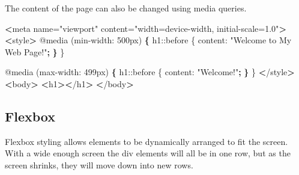 \documentclass[]{book}
\newenvironment{Shaded}{\begin{snugshade}}{\end{snugshade}}
\newcommand{\KeywordTok}[1]{\textcolor[rgb]{0.13,0.29,0.53}{\textbf{#1}}}
\newcommand{\StringTok}[1]{\textcolor[rgb]{0.31,0.60,0.02}{#1}}
\newcommand{\OperatorTok}[1]{\textcolor[rgb]{0.81,0.36,0.00}{\textbf{#1}}}
\newcommand{\ExtensionTok}[1]{#1}
\newcommand{\NormalTok}[1]{#1}
\begin{document}
The content of the page can also be changed using media queries.

\begin{Shaded}
\begin{Highlighting}[]
\OperatorTok{<}\ExtensionTok{meta}\NormalTok{ name=}\StringTok{"viewport"}\NormalTok{ content=}\StringTok{"width=device-width, initial-scale=1.0"}\OperatorTok{>}
\OperatorTok{<}\ExtensionTok{style}\OperatorTok{>}
    \ExtensionTok{@media}\NormalTok{ (min-width: 500px) }\KeywordTok{\{}
        \ExtensionTok{h1}\NormalTok{::before \{}
            \ExtensionTok{content}\NormalTok{: }\StringTok{"Welcome to My Web Page!"}\KeywordTok{;}
        \KeywordTok{\}}
\NormalTok{    \}}

    \ExtensionTok{@media}\NormalTok{ (max-width: 499px) }\KeywordTok{\{}
        \ExtensionTok{h1}\NormalTok{::before \{}
            \ExtensionTok{content}\NormalTok{: }\StringTok{"Welcome!"}\KeywordTok{;}
        \KeywordTok{\}}
\NormalTok{    \}}
\OperatorTok{<}\NormalTok{/}\ExtensionTok{style}\OperatorTok{>}
\OperatorTok{<}\ExtensionTok{body}\OperatorTok{>}
    \OperatorTok{<}\ExtensionTok{h1}\OperatorTok{><}\NormalTok{/h1}\OperatorTok{>}
\OperatorTok{<}\NormalTok{/}\ExtensionTok{body}\OperatorTok{>}
\end{Highlighting}
\end{Shaded}

\subsection{Flexbox}\label{flexbox}

Flexbox styling allows elements to be dynamically arranged to fit the
screen. With a wide enough screen the div elements will all be in one
row, but as the screen shrinks, they will move down into new rows.
\end{document}
